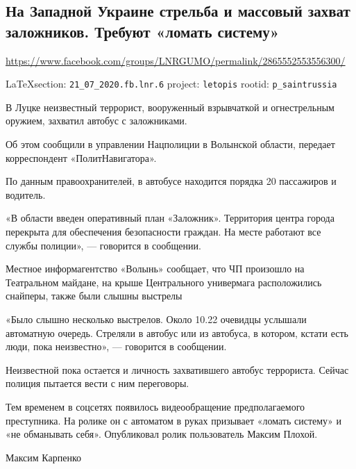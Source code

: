  
 
\subsection{На Западной Украине стрельба и массовый захват заложников. Требуют «ломать систему»}
\url{https://www.facebook.com/groups/LNRGUMO/permalink/2865552553556300/}
  
\vspace{0.5cm}
{\small\LaTeX section: \verb|21_07_2020.fb.lnr.6| project: \verb|letopis| rootid: \verb|p_saintrussia|}
\vspace{0.5cm}


В Луцке неизвестный террорист, вооруженный взрывчаткой и огнестрельным оружием,
захватил автобус с заложниками.

Об этом сообщили в управлении Нацполиции в Волынской области, передает
корреспондент «ПолитНавигатора».

По данным правоохранителей, в автобусе находится порядка 20 пассажиров и
водитель.

«В области введен оперативный план «Заложник». Территория центра города
перекрыта для обеспечения безопасности граждан. На месте работают все службы
полиции», --- говорится в сообщении.

Местное информагентство «Волынь» сообщает, что ЧП произошло на Театральном
майдане, на крыше Центрального универмага расположились снайперы, также были
слышны выстрелы

«Было слышно несколько выстрелов. Около 10.22 очевидцы услышали автоматную
очередь. Стреляли в автобус или из автобуса, в котором, кстати есть люди, пока
неизвестно», --- говорится в сообщении.

Неизвестной пока остается и личность захватившего автобус террориста. Сейчас
полиция пытается вести с ним переговоры.

Тем временем в соцсетях появилось видеообращение предполагаемого преступника.
На ролике он с автоматом в руках призывает «ломать систему» и «не обманывать
себя». Опубликовал ролик пользователь Максим Плохой.

Максим Карпенко
  
